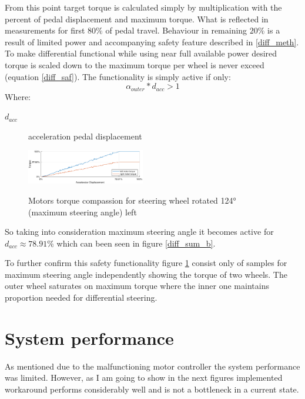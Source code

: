 From this point target torque is calculated simply by multiplication with the percent of pedal displacement and maximum torque. What is reflected in measurements for first $80\%$ of pedal travel. 
Behaviour in remaining $20\%$ is a result of limited power and accompanying safety feature described in \ref{diff_meth}. To make differential functional while using near full available power desired torque is scaled down to the maximum torque per wheel is never exceed (equation \ref{diff_saf}).
The functionality is simply active if only: \begin{equation*}
    \alpha_{outer} * d_{acc}>1
\end{equation*} 
Where:
\begin{description}
    \item[$d_{acc}$] acceleration pedal displacement
\end{description}

\begin{figure}
    \vspace{-20pt}
    \begin{center}
        \includegraphics[width=0.46\textwidth]{figures/diff_123}
        \label{diff_123}
        \caption{Motors torque compassion for steering wheel rotated 124° (maximum steering angle) left}
    \end{center}
    \vspace{-20pt}
\end{figure}
So taking into consideration maximum steering angle it becomes active for $d_{acc} \approx 78.91\%$ which can been seen in figure \ref{diff_sum_b}.

To further confirm this safety functionality figure \ref{diff_123} consist only of samples for maximum steering angle independently showing the torque of two wheels. The outer wheel saturates on maximum torque where the inner one maintains proportion needed for differential steering.







\section{System performance}
As mentioned due to the malfunctioning motor controller the system performance was limited. However, as I am going to show in the next figures implemented workaround performs considerably well and is not a bottleneck in a current state.

